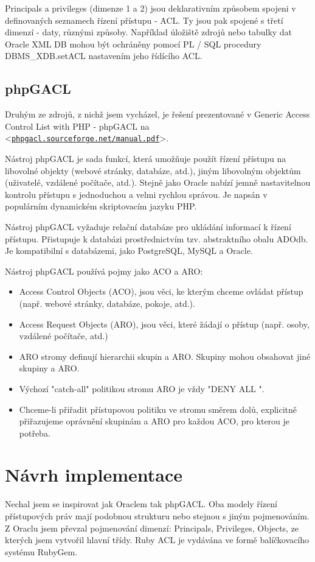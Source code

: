 \documentclass[11pt,twoside,a4paper]{book}
\let\oldUrl\url
\renewcommand\url[1]{<\texttt{\oldUrl{#1}}>}
\begin{document}
Principals a privileges (dimenze 1 a 2) jsou deklarativním způsobem spojeni v definovaných seznamech řízení přístupu - ACL. Ty jsou pak spojené s třetí dimenzí - daty, různými způsoby. Například úložiště zdrojů nebo tabulky dat Oracle XML DB mohou být ochráněny pomocí PL / SQL procedury DBMS\_XDB.setACL nastavením jeho řídícího ACL.


\subsection{phpGACL}
Druhým ze zdrojů, z nichž jsem vycházel, je řešení prezentované v Generic Access Control List with PHP - phpGACL na  \url{phpgacl.sourceforge.net/manual.pdf}.

Nástroj phpGACL je sada funkcí, která umožňuje použít řízení přístupu na libovolné objekty (webové stránky, databáze, atd.), jiným libovolným objektům (uživatelé, vzdálené počítače, atd.). 
Stejně jako Oracle nabízí jemně nastavitelnou kontrolu přístupu s jednoduchou a velmi rychlou správou. Je napsán v populárním dynamickém skriptovacím jazyku PHP.

Nástroj phpGACL vyžaduje relační databáze pro ukládání informací k řízení přístupu. Přistupuje k databázi prostřednictvím tzv. abstraktního obalu ADOdb. Je kompatibilní s databázemi, jako PostgreSQL, MySQL a Oracle. 

Nástroj phpGACL používá pojmy jako ACO a ARO:
\begin{itemize}
\item Access Control Objects (ACO), jsou věci, ke kterým chceme ovládat přístup (např. webové stránky, databáze, pokoje, atd.).
\item Access Request Objects (ARO), jsou věci, které žádají o přístup (např. osoby, vzdálené počítače, atd.)
\item ARO stromy definují hierarchii skupin a ARO. Skupiny mohou obsahovat jiné skupiny a ARO.
\item Výchozí "catch-all" politikou stromu ARO je vždy "DENY ALL ".
\item Chceme-li přiřadit přístupovou politiku ve stromu směrem dolů, explicitně přiřazujeme oprávnění skupinám a ARO pro každou ACO, pro kterou je potřeba.
\end{itemize}

\section{Návrh implementace}
Nechal jsem se inspirovat jak Oraclem tak phpGACL. Oba modely řízení přístupových práv mají podobnou strukturu nebo stejnou s jiným pojmenováním. Z Oraclu jsem převzal pojmenování dimenzí: Principals, Privileges, Objects, ze kterých jsem vytvořil hlavní třídy. 
Ruby ACL je vydávána ve formě balíčkovacího systému RubyGem.
\end{document}
